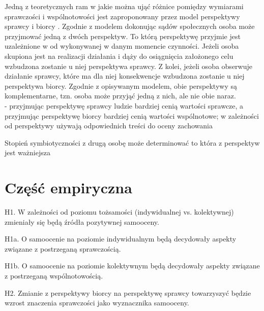 \documentclass[man]{apa6}
\begin{document}
Jedną z teoretycznych ram w jakie można ująć różnice pomiędzy wymiarami sprawczości i wspólnotowości jest zaproponowany przez \textcite{wojciszke2006perspektywa} model perspektywy sprawcy i biorcy \parencite[w ostatnich opracowaniach określany również jako model perspektywy aktora i obserwatora,][]{abele2014communal}. Zgodnie z modelem dokonując sądów społecznych osoba może przyjmować jedną z dwóch perspektyw. To którą perspektywę przyjmie jest uzależnione w od wykonywanej w danym momencie czynności. Jeżeli osoba skupiona jest na realizacji działania i dąży do osiągnięcia założonego celu wzbudzona zostanie u niej perspektywa sprawcy. Z kolei, jeżeli osoba obserwuje działanie sprawcy, które ma dla niej konsekwencje wzbudzona zostanie u niej perspektywa biorcy. Zgodnie z opisywanym modelem, obie perspektywy są komplementarne, tzn. osoba może przyjąć jedną z nich, ale nie obie naraz.\\

\parencite{wojciszke1997parallels} - przyjmując perspektywę sprawcy ludzie bardziej cenią wartości sprawcze, a przyjmując perspektywę biorcy bardziej cenią wartości wspólnotowe; w zależności od perspektywy używają odpowiednich treści do oceny zachowania \parencite[zob. również][]{wojciszke1994multiple}

Stopień symbiotyczności z drugą osobę może determinować to która z perspektyw jest ważniejsza \parencite{wojciszke2008primacy}





\newpage
\section{Część empiryczna}

\begin{APAitemize}
\item H1.  W zależności od poziomu tożsamości (indywidualnej vs. kolektywnej) zmieniały się będą źródła pozytywnej samooceny.
\item H1a. O samoocenie na poziomie indywidualnym będą decydowały aspekty związane z postrzeganą sprawczością.
\item H1b. O samoocenie na poziomie kolektywnym będą decydowały aspekty związane z postrzeganą wspólnotowością.
\item H2.  Zmianie z perspektywy biorcy na perspektywę sprawcy towarzyszyć będzie wzrost znaczenia sprawczości jako wyznacznika samooceny.
\end{APAitemize}
\end{document}
